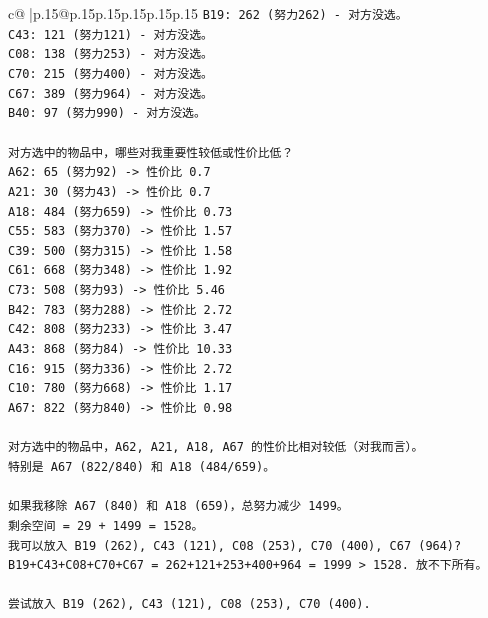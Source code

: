 \documentclass{article}
\begin{document}
{\begin{supertabular}{c@{$\;$}|p{.15\linewidth}@{}p{.15\linewidth}p{.15\linewidth}p{.15\linewidth}p{.15\linewidth}p{.15\linewidth}}
{{{\texttt{B19: 262 (努力262) {-} 对方没选。} \\
\texttt{C43: 121 (努力121) {-} 对方没选。} \\
\texttt{C08: 138 (努力253) {-} 对方没选。} \\
\texttt{C70: 215 (努力400) {-} 对方没选。} \\
\texttt{C67: 389 (努力964) {-} 对方没选。} \\
\texttt{B40: 97 (努力990) {-} 对方没选。} \\
\\ 
\texttt{对方选中的物品中，哪些对我重要性较低或性价比低？} \\
\texttt{A62: 65 (努力92) {-}> 性价比 0.7} \\
\texttt{A21: 30 (努力43) {-}> 性价比 0.7} \\
\texttt{A18: 484 (努力659) {-}> 性价比 0.73} \\
\texttt{C55: 583 (努力370) {-}> 性价比 1.57} \\
\texttt{C39: 500 (努力315) {-}> 性价比 1.58} \\
\texttt{C61: 668 (努力348) {-}> 性价比 1.92} \\
\texttt{C73: 508 (努力93) {-}> 性价比 5.46} \\
\texttt{B42: 783 (努力288) {-}> 性价比 2.72} \\
\texttt{C42: 808 (努力233) {-}> 性价比 3.47} \\
\texttt{A43: 868 (努力84) {-}> 性价比 10.33} \\
\texttt{C16: 915 (努力336) {-}> 性价比 2.72} \\
\texttt{C10: 780 (努力668) {-}> 性价比 1.17} \\
\texttt{A67: 822 (努力840) {-}> 性价比 0.98} \\
\\ 
\texttt{对方选中的物品中，A62, A21, A18, A67 的性价比相对较低（对我而言）。} \\
\texttt{特别是 A67 (822/840) 和 A18 (484/659)。} \\
\\ 
\texttt{如果我移除 A67 (840) 和 A18 (659)，总努力减少 1499。} \\
\texttt{剩余空间 = 29 + 1499 = 1528。} \\
\texttt{我可以放入 B19 (262), C43 (121), C08 (253), C70 (400), C67 (964)?} \\
\texttt{B19+C43+C08+C70+C67 = 262+121+253+400+964 = 1999 > 1528. 放不下所有。} \\
\\ 
\texttt{尝试放入 B19 (262), C43 (121), C08 (253), C70 (400).} \\
}}}
\end{supertabular}}
\end{document}
